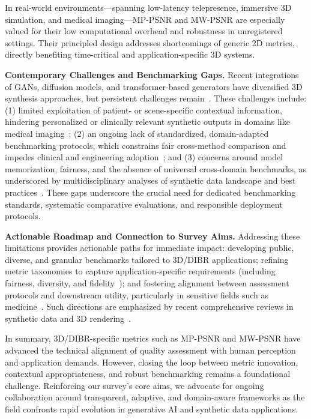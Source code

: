 \documentclass[sigconf]{acmart}
\begin{document}
In real-world environments—spanning low-latency telepresence, immersive 3D simulation, and medical imaging—MP-PSNR and MW-PSNR are especially valued for their low computational overhead and robustness in unregistered settings. Their principled design addresses shortcomings of generic 2D metrics, directly benefiting time-critical and application-specific 3D systems.

\textbf{Contemporary Challenges and Benchmarking Gaps.} Recent integrations of GANs, diffusion models, and transformer-based generators have diversified 3D synthesis approaches, but persistent challenges remain~\cite{ref87,ref88,ref89}. These challenges include: (1) limited exploitation of patient- or scene-specific contextual information, hindering personalized or clinically relevant synthetic outputs in domains like medical imaging~\cite{ref89}; (2) an ongoing lack of standardized, domain-adapted benchmarking protocols, which constrains fair cross-method comparison and impedes clinical and engineering adoption~\cite{ref87,ref89}; and (3) concerns around model memorization, fairness, and the absence of universal cross-domain benchmarks, as underscored by multidisciplinary analyses of synthetic data landscape and best practices~\cite{ref87,ref88}. These gaps underscore the crucial need for dedicated benchmarking standards, systematic comparative evaluations, and responsible deployment protocols.

\textbf{Actionable Roadmap and Connection to Survey Aims.} Addressing these limitations provides actionable paths for immediate impact: developing public, diverse, and granular benchmarks tailored to 3D/DIBR applications; refining metric taxonomies to capture application-specific requirements (including fairness, diversity, and fidelity~\cite{ref87,ref88}); and fostering alignment between assessment protocols and downstream utility, particularly in sensitive fields such as medicine~\cite{ref89}. Such directions are emphasized by recent comprehensive reviews in synthetic data and 3D rendering~\cite{ref87}\cite{ref88}\cite{ref89}\cite{ref90}\cite{ref93}\cite{ref95}\cite{ref101}\cite{ref102}. 

In summary, 3D/DIBR-specific metrics such as MP-PSNR and MW-PSNR have advanced the technical alignment of quality assessment with human perception and application demands. However, closing the loop between metric innovation, contextual appropriateness, and robust benchmarking remains a foundational challenge. Reinforcing our survey's core aims, we advocate for ongoing collaboration around transparent, adaptive, and domain-aware frameworks as the field confronts rapid evolution in generative AI and synthetic data applications.
\end{document}
